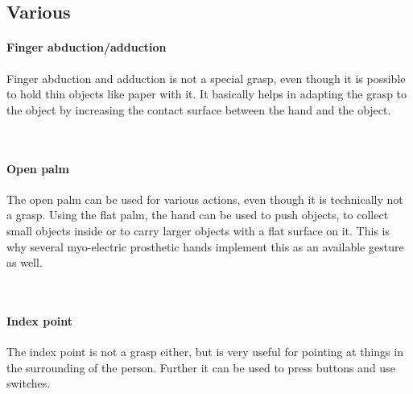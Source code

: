 \documentclass[main]{subfiles}
\begin{document}
\subsection{Various}

\paragraph{Finger abduction/adduction}
Finger abduction and adduction is not a special grasp, even though it is possible to hold thin objects like paper with it. It basically helps in adapting the grasp to the object by increasing the contact surface between the hand and the object.

\begin{figure}[H]
\hspace{0.15\textwidth}
\hspace{0.15\textwidth}
\\
\label{Adduction-grasp}
\end{figure}

\paragraph{Open palm}
The open palm can be used for various actions, even though it is technically not a grasp. Using the flat palm, the hand can be used to push objects, to collect small objects inside or to carry larger objects with a flat surface on it. This is why several myo-electric prosthetic hands implement this as an available gesture as well.

\begin{figure}[H]
\hspace{0.15\textwidth}
\hspace{0.15\textwidth}
\\
\label{Open-palm}
\end{figure}

\paragraph{Index point}
The index point is not a grasp either, but is very useful for pointing at things in the surrounding of the person. Further it can be used to press buttons and use switches.

\end{document}

